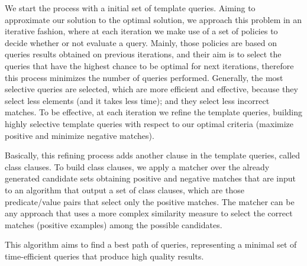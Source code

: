 We start the process with a initial set of template queries. Aiming to approximate our solution to the optimal solution, we approach this problem in an iterative fashion, where at each iteration we make use of a set of policies to decide whether or not evaluate a query. Mainly, those policies are based on queries results obtained on previous iterations, and their aim is to select the queries that have the highest chance to be optimal for next iterations, therefore this process minimizes the number of queries performed. Generally, the most selective queries are selected, which are more efficient and effective, because they select less elements (and it takes less time); and they select less incorrect matches. To be effective, at each iteration we refine the template queries, building highly selective template queries with respect to our optimal criteria (maximize positive and minimize negative matches). 

Basically, this refining process adds another clause in the template queries, called class clauses. To build class clauses, we apply a matcher over the already generated candidate sets obtaining positive and negative matches that are input to an algorithm that output a set of class clauses, which are those predicate/value pairs that select only the positive matches.  The matcher can be any approach that uses a more complex similarity measure to select the correct matches (positive examples) among the possible candidates. 

This algorithm aims to find a best path of queries, representing a minimal set of time-efficient queries that produce high quality results.



 

